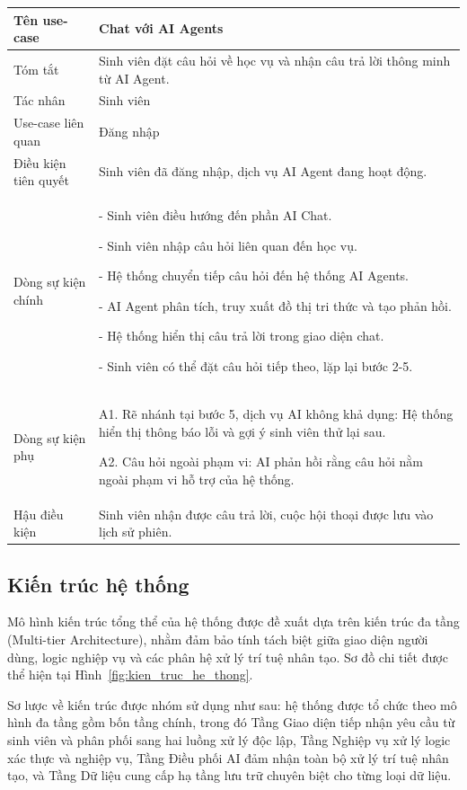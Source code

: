 \begin{longtable}{|>{\raggedright\arraybackslash}p{4.2cm}|>{\raggedright\arraybackslash}p{9.8cm}|}
	\hline
	Tên use-case & Chat với AI Agents \\ \hline
	Tóm tắt & Sinh viên đặt câu hỏi về học vụ và nhận câu trả lời thông minh từ AI Agent. \\ \hline
	Tác nhân & Sinh viên \\ \hline
	Use-case liên quan & Đăng nhập \\ \hline
	Điều kiện tiên quyết & Sinh viên đã đăng nhập, dịch vụ AI Agent đang hoạt động. \\ \hline
	Dòng sự kiện chính &
	
		
- Sinh viên điều hướng đến phần AI Chat.
		
- Sinh viên nhập câu hỏi liên quan đến học vụ.
		
- Hệ thống chuyển tiếp câu hỏi đến hệ thống AI Agents.
		
- AI Agent phân tích, truy xuất đồ thị tri thức và tạo phản hồi.
		
- Hệ thống hiển thị câu trả lời trong giao diện chat.
		
- Sinh viên có thể đặt câu hỏi tiếp theo, lặp lại bước 2-5.
	 \\ \hline
	Dòng sự kiện phụ & A1. Rẽ nhánh tại bước 5, dịch vụ AI không khả dụng: Hệ thống hiển thị thông báo lỗi và gợi ý sinh viên thử lại sau.\par\medskip
	A2. Câu hỏi ngoài phạm vi: AI phản hồi rằng câu hỏi nằm ngoài phạm vi hỗ trợ của hệ thống. \\ \hline
	Hậu điều kiện & Sinh viên nhận được câu trả lời, cuộc hội thoại được lưu vào lịch sử phiên. \\ \hline
\end{longtable}

\setcounter{secnumdepth}{3}
\setcounter{tocdepth}{3}

\subsection{Kiến trúc hệ thống}

Mô hình kiến trúc tổng thể của hệ thống được đề xuất dựa trên kiến trúc đa tầng (Multi-tier Architecture), nhằm đảm bảo tính tách biệt giữa giao diện người dùng, logic nghiệp vụ và các phân hệ xử lý trí tuệ nhân tạo. Sơ đồ chi tiết được thể hiện tại Hình~\ref{fig:kien_truc_he_thong}.

Sơ lược về kiến trúc được nhóm sử dụng như sau: hệ thống được tổ chức theo mô hình đa tầng gồm bốn tầng chính, trong đó Tầng Giao diện tiếp nhận yêu cầu từ sinh viên và phân phối sang hai luồng xử lý độc lập, Tầng Nghiệp vụ xử lý logic xác thực và nghiệp vụ, Tầng Điều phối AI đảm nhận toàn bộ xử lý trí tuệ nhân tạo, và Tầng Dữ liệu cung cấp hạ tầng lưu trữ chuyên biệt cho từng loại dữ liệu.

